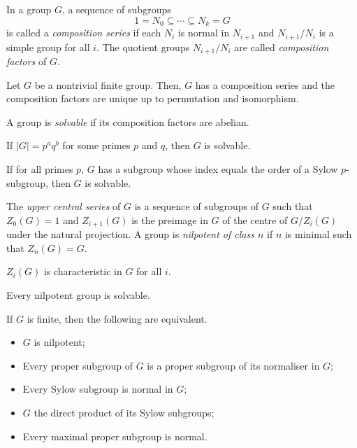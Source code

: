 \begin{defn}
    In a group $G$, a sequence of subgroups
    \[1=N_0\subseteq\cdots\subseteq N_k=G\]
    is called a \emph{composition series} if each $N_i$ is normal in $N_{i+1}$
    and $N_{i+1}/N_i$ is a simple group for all $i$. The quotient groups
    $N_{i+1}/N_i$ are called \emph{composition factors} of $G$.
\end{defn}
\begin{thm}
    Let $G$ be a nontrivial finite group. Then, $G$ has a composition series and
    the composition factors are unique up to permutation and isomorphism.
\end{thm}
\begin{defn}
    A group is \emph{solvable} if its composition factors are abelian.
\end{defn}
\begin{thm}[Burnside]
    If $|G|=p^a q^b$ for some primes $p$ and $q$, then $G$ is solvable.
\end{thm}
\begin{thm}[Hall]
    If for all primes $p$, $G$ has a subgroup whose index equals the order of a
    Sylow $p$-subgroup, then $G$ is solvable.
\end{thm}
\begin{defn}
    The \emph{upper central series} of $G$ is a sequence of subgroups of $G$ such that
    $Z_0(G)=1$ and $Z_{i+1}(G)$ is the preimage in $G$ of the centre of
    $G/Z_i(G)$ under the natural projection. A group is \emph{nilpotent of class
    $n$} if $n$ is minimal such that $Z_n(G)=G$.
\end{defn}
\begin{prop}
    $Z_i(G)$ is characteristic in $G$ for all $i$.
\end{prop}
\begin{prop}
    Every nilpotent group is solvable.
\end{prop}
\begin{thm}
    If $G$ is finite, then the following are equivalent.
    \begin{itemize}
        \item $G$ is nilpotent;
        \item Every proper subgroup of $G$ is a proper subgroup of its
            normaliser in $G$;
        \item Every Sylow subgroup is normal in $G$;
        \item $G$ the direct product of its Sylow subgroups;
        \item Every maximal proper subgroup is normal.
    \end{itemize}
\end{thm}
